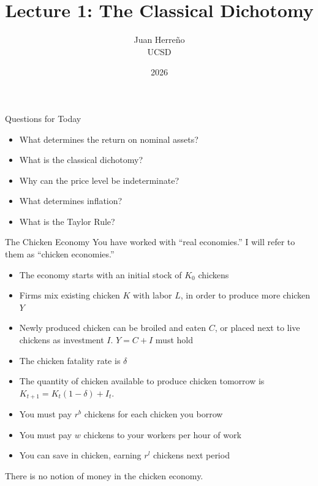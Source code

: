 \documentclass[11pt,aspectratio=169,xcolor={dvipsnames},hyperref={pdftex,pdfpagemode=UseNone,hidelinks,pdfdisplaydoctitle=true},usepdftitle=false]{beamer}
\title{Lecture 1: The Classical Dichotomy}
\author{Juan Herre\~{n}o\\UCSD}
\date{2026}
\begin{document}
\maketitle

\begin{frame}{Questions for Today}
\begin{itemize}
\item What determines the return on nominal assets?
\item What is the classical dichotomy?
\item Why can the price level be indeterminate?
\item What determines inflation?
\item What is the Taylor Rule?
\end{itemize}
\end{frame}



\begin{frame}{The Chicken Economy}
You have worked with ``real economies.'' I will refer to them as ``chicken economies.''
\begin{itemize}
\item The economy starts with an initial stock of $K_0$ chickens
\item Firms mix existing chicken $K$ with labor $L$, in order to produce more chicken $Y$
\item Newly produced chicken can be broiled and eaten $C$, or placed next to live chickens as investment $I$. $Y = C + I$ must hold
\item The chicken fatality rate is $\delta$
\item The quantity of chicken available to produce chicken tomorrow is $K_{t+1} = K_t (1-\delta) + I_t$.
\item You must pay $r^b$ chickens for each chicken you borrow
\item You must pay $w$ chickens to your workers per hour of work
\item You can save in chicken, earning $r^l$ chickens next period
\end{itemize}
There is no notion of money in the chicken economy.
\end{frame}
\end{document}
